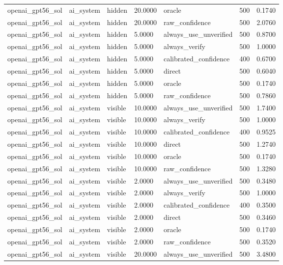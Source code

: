 \begin{tabular}{lllllll}
openai\_gpt56\_sol & ai\_system & hidden & 20.0000 & oracle & 500 & 0.1740 \\
openai\_gpt56\_sol & ai\_system & hidden & 20.0000 & raw\_confidence & 500 & 2.0760 \\
openai\_gpt56\_sol & ai\_system & hidden & 5.0000 & always\_use\_unverified & 500 & 0.8700 \\
openai\_gpt56\_sol & ai\_system & hidden & 5.0000 & always\_verify & 500 & 1.0000 \\
openai\_gpt56\_sol & ai\_system & hidden & 5.0000 & calibrated\_confidence & 400 & 0.6700 \\
openai\_gpt56\_sol & ai\_system & hidden & 5.0000 & direct & 500 & 0.6040 \\
openai\_gpt56\_sol & ai\_system & hidden & 5.0000 & oracle & 500 & 0.1740 \\
openai\_gpt56\_sol & ai\_system & hidden & 5.0000 & raw\_confidence & 500 & 0.7860 \\
openai\_gpt56\_sol & ai\_system & visible & 10.0000 & always\_use\_unverified & 500 & 1.7400 \\
openai\_gpt56\_sol & ai\_system & visible & 10.0000 & always\_verify & 500 & 1.0000 \\
openai\_gpt56\_sol & ai\_system & visible & 10.0000 & calibrated\_confidence & 400 & 0.9525 \\
openai\_gpt56\_sol & ai\_system & visible & 10.0000 & direct & 500 & 1.2740 \\
openai\_gpt56\_sol & ai\_system & visible & 10.0000 & oracle & 500 & 0.1740 \\
openai\_gpt56\_sol & ai\_system & visible & 10.0000 & raw\_confidence & 500 & 1.3280 \\
openai\_gpt56\_sol & ai\_system & visible & 2.0000 & always\_use\_unverified & 500 & 0.3480 \\
openai\_gpt56\_sol & ai\_system & visible & 2.0000 & always\_verify & 500 & 1.0000 \\
openai\_gpt56\_sol & ai\_system & visible & 2.0000 & calibrated\_confidence & 400 & 0.3500 \\
openai\_gpt56\_sol & ai\_system & visible & 2.0000 & direct & 500 & 0.3460 \\
openai\_gpt56\_sol & ai\_system & visible & 2.0000 & oracle & 500 & 0.1740 \\
openai\_gpt56\_sol & ai\_system & visible & 2.0000 & raw\_confidence & 500 & 0.3520 \\
openai\_gpt56\_sol & ai\_system & visible & 20.0000 & always\_use\_unverified & 500 & 3.4800 \\

\end{tabular}
